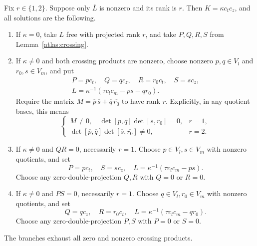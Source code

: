 \begin{proposition}\label{atlas:single}
Fix \(r\in\{1,2\}\).  Suppose only \(\overline L\) is nonzero and its rank
is \(r\).  Then \(K=\kappa c_tc_z\), and all solutions are the following.
\begin{enumerate}
\item If \(\kappa=0\), take \(L\) free with projected rank \(r\), and take
\(P,Q,R,S\) from Lemma~\ref{atlas:crossing}.
\item If \(\kappa\ne0\) and both crossing products are nonzero, choose
nonzero \(p,q\in V_l\) and \(r_0,s\in V_m\), and put
\begin{equation}\label{atlas:single-live}
 \begin{gathered}
 P=p c_t,\quad Q=q c_z,\quad R=r_0c_t,\quad S=s c_z,\\
 L=\kappa^{-1}(\tau c_lc_m-ps-qr_0).
 \end{gathered}
\end{equation}
Require the matrix \(M=\overline p\,\overline s+
\overline q\,\overline{r_0}\) to have rank \(r\).
Explicitly, in any quotient bases, this means
\[
\begin{cases}
 M\ne0,\quad
 \det[\overline p,\overline q]\det[\overline s,\overline{r_0}]=0,
 &r=1,\\
 \det[\overline p,\overline q]\det[\overline s,\overline{r_0}]\ne0,
 &r=2.
\end{cases}
\]
\item If \(\kappa\ne0\) and \(QR=0\), necessarily \(r=1\).
Choose \(p\in V_l,s\in V_m\) with nonzero quotients, and set
\[
 P=p c_t,\quad S=s c_z,\quad
 L=\kappa^{-1}(\tau c_lc_m-ps).
\]
Choose any zero-double-projection \(Q,R\) with \(Q=0\) or \(R=0\).
\item If \(\kappa\ne0\) and \(PS=0\), necessarily \(r=1\).
Choose \(q\in V_l,r_0\in V_m\) with nonzero quotients, and set
\[
 Q=q c_z,\quad R=r_0c_t,\quad
 L=\kappa^{-1}(\tau c_lc_m-qr_0).
\]
Choose any zero-double-projection \(P,S\) with \(P=0\) or \(S=0\).
\end{enumerate}
The branches exhaust all zero and nonzero crossing products.
\end{proposition}


